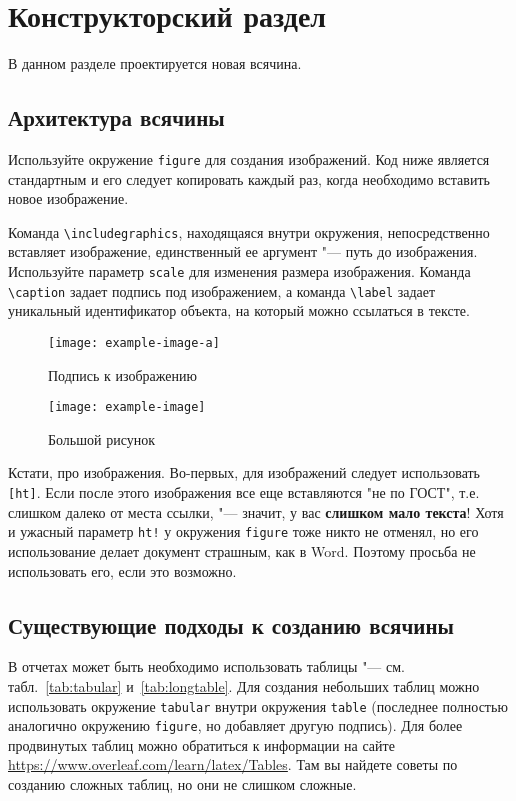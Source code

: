 \chapter{Конструкторский раздел}
\label{cha:design}

В данном разделе проектируется новая всячина.

\section{Архитектура всячины}

Используйте окружение \verb|figure| для создания изображений. Код ниже является стандартным и его следует копировать каждый раз, когда необходимо вставить новое изображение.

Команда \verb|\includegraphics|, находящаяся внутри окружения, непосредственно вставляет изображение, единственный ее аргумент "--- путь до изображения. Используйте параметр \verb|scale| для изменения размера изображения. Команда \verb|\caption| задает подпись под изображением, а команда \verb|\label| задает уникальный идентификатор объекта, на который можно ссылаться в тексте.

\begin{figure}[ht]
    \centering
    \texttt{[image: example-image-a]}
    \caption{Подпись к изображению}
    \label{fig:example_fig_1}
\end{figure}

\begin{figure}[ht]
    \centering
    \texttt{[image: example-image]}
    \caption{Большой рисунок}
\end{figure}

Кстати, про изображения. Во-первых, для изображений следует использовать \verb|[ht]|. Если после этого изображения все еще вставляются "{}не по ГОСТ"{}, т.е. слишком далеко от места ссылки, "--- значит, у вас \textbf{слишком мало текста}! Хотя и ужасный параметр \verb|ht!| у окружения \texttt{figure} тоже никто не отменял, но его использование делает документ страшным, как в Word. Поэтому просьба не использовать его, если это возможно.

\section{Существующие подходы к созданию всячины}

В отчетах может быть необходимо использовать таблицы "--- см. табл.~\ref{tab:tabular} и~\ref{tab:longtable}. Для создания небольших таблиц можно использовать окружение \verb|tabular| внутри окружения \verb|table| (последнее полностью аналогично окружению \verb|figure|, но добавляет другую подпись). Для более продвинутых таблиц можно обратиться к информации на сайте \url{https://www.overleaf.com/learn/latex/Tables}. Там вы найдете советы по созданию сложных таблиц, но они не слишком сложные.

